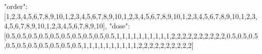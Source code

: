 \documentclass[
  letterpaper,
  DIV=11,
  numbers=noendperiod]{scrartcl}
\newenvironment{Shaded}{\begin{snugshade}}{\end{snugshade}}
\newcommand{\DecValTok}[1]{\textcolor[rgb]{0.68,0.00,0.00}{#1}}
\newcommand{\FloatTok}[1]{\textcolor[rgb]{0.68,0.00,0.00}{#1}}
\newcommand{\NormalTok}[1]{\textcolor[rgb]{0.00,0.23,0.31}{#1}}
\newcommand{\StringTok}[1]{\textcolor[rgb]{0.13,0.47,0.30}{#1}}
\begin{document}
\begin{Shaded}
\begin{Highlighting}[]
       \StringTok{"order"}\NormalTok{: [}\DecValTok{1}\NormalTok{,}\DecValTok{2}\NormalTok{,}\DecValTok{3}\NormalTok{,}\DecValTok{4}\NormalTok{,}\DecValTok{5}\NormalTok{,}\DecValTok{6}\NormalTok{,}\DecValTok{7}\NormalTok{,}\DecValTok{8}\NormalTok{,}\DecValTok{9}\NormalTok{,}\DecValTok{10}\NormalTok{,}\DecValTok{1}\NormalTok{,}\DecValTok{2}\NormalTok{,}\DecValTok{3}\NormalTok{,}\DecValTok{4}\NormalTok{,}\DecValTok{5}\NormalTok{,}\DecValTok{6}\NormalTok{,}\DecValTok{7}\NormalTok{,}\DecValTok{8}\NormalTok{,}\DecValTok{9}\NormalTok{,}\DecValTok{10}\NormalTok{,}\DecValTok{1}\NormalTok{,}\DecValTok{2}\NormalTok{,}\DecValTok{3}\NormalTok{,}\DecValTok{4}\NormalTok{,}\DecValTok{5}\NormalTok{,}\DecValTok{6}\NormalTok{,}\DecValTok{7}\NormalTok{,}\DecValTok{8}\NormalTok{,}\DecValTok{9}\NormalTok{,}\DecValTok{10}\NormalTok{,}\DecValTok{1}\NormalTok{,}\DecValTok{2}\NormalTok{,}\DecValTok{3}\NormalTok{,}\DecValTok{4}\NormalTok{,}\DecValTok{5}\NormalTok{,}\DecValTok{6}\NormalTok{,}\DecValTok{7}\NormalTok{,}\DecValTok{8}\NormalTok{,}\DecValTok{9}\NormalTok{,}\DecValTok{10}\NormalTok{,}\DecValTok{1}\NormalTok{,}\DecValTok{2}\NormalTok{,}\DecValTok{3}\NormalTok{,}\DecValTok{4}\NormalTok{,}\DecValTok{5}\NormalTok{,}\DecValTok{6}\NormalTok{,}\DecValTok{7}\NormalTok{,}\DecValTok{8}\NormalTok{,}\DecValTok{9}\NormalTok{,}\DecValTok{10}\NormalTok{,}\DecValTok{1}\NormalTok{,}\DecValTok{2}\NormalTok{,}\DecValTok{3}\NormalTok{,}\DecValTok{4}\NormalTok{,}\DecValTok{5}\NormalTok{,}\DecValTok{6}\NormalTok{,}\DecValTok{7}\NormalTok{,}\DecValTok{8}\NormalTok{,}\DecValTok{9}\NormalTok{,}\DecValTok{10}\NormalTok{],}
       \StringTok{"dose"}\NormalTok{: [}\FloatTok{0.5}\NormalTok{,}\FloatTok{0.5}\NormalTok{,}\FloatTok{0.5}\NormalTok{,}\FloatTok{0.5}\NormalTok{,}\FloatTok{0.5}\NormalTok{,}\FloatTok{0.5}\NormalTok{,}\FloatTok{0.5}\NormalTok{,}\FloatTok{0.5}\NormalTok{,}\FloatTok{0.5}\NormalTok{,}\FloatTok{0.5}\NormalTok{,}\DecValTok{1}\NormalTok{,}\DecValTok{1}\NormalTok{,}\DecValTok{1}\NormalTok{,}\DecValTok{1}\NormalTok{,}\DecValTok{1}\NormalTok{,}\DecValTok{1}\NormalTok{,}\DecValTok{1}\NormalTok{,}\DecValTok{1}\NormalTok{,}\DecValTok{1}\NormalTok{,}\DecValTok{1}\NormalTok{,}\DecValTok{2}\NormalTok{,}\DecValTok{2}\NormalTok{,}\DecValTok{2}\NormalTok{,}\DecValTok{2}\NormalTok{,}\DecValTok{2}\NormalTok{,}\DecValTok{2}\NormalTok{,}\DecValTok{2}\NormalTok{,}\DecValTok{2}\NormalTok{,}\DecValTok{2}\NormalTok{,}\DecValTok{2}\NormalTok{,}\FloatTok{0.5}\NormalTok{,}\FloatTok{0.5}\NormalTok{,}\FloatTok{0.5}\NormalTok{,}\FloatTok{0.5}\NormalTok{,}\FloatTok{0.5}\NormalTok{,}\FloatTok{0.5}\NormalTok{,}\FloatTok{0.5}\NormalTok{,}\FloatTok{0.5}\NormalTok{,}\FloatTok{0.5}\NormalTok{,}\FloatTok{0.5}\NormalTok{,}\DecValTok{1}\NormalTok{,}\DecValTok{1}\NormalTok{,}\DecValTok{1}\NormalTok{,}\DecValTok{1}\NormalTok{,}\DecValTok{1}\NormalTok{,}\DecValTok{1}\NormalTok{,}\DecValTok{1}\NormalTok{,}\DecValTok{1}\NormalTok{,}\DecValTok{1}\NormalTok{,}\DecValTok{1}\NormalTok{,}\DecValTok{2}\NormalTok{,}\DecValTok{2}\NormalTok{,}\DecValTok{2}\NormalTok{,}\DecValTok{2}\NormalTok{,}\DecValTok{2}\NormalTok{,}\DecValTok{2}\NormalTok{,}\DecValTok{2}\NormalTok{,}\DecValTok{2}\NormalTok{,}\DecValTok{2}\NormalTok{,}\DecValTok{2}\NormalTok{]}

\end{Highlighting}
\end{Shaded}
\end{document}
